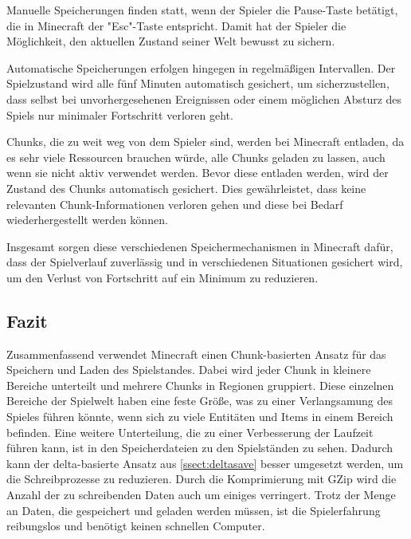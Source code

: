 Manuelle Speicherungen finden statt, wenn der Spieler die Pause-Taste betätigt, die in Minecraft der "Esc"-Taste entspricht. Damit hat der Spieler die Möglichkeit, den aktuellen Zustand seiner Welt bewusst zu sichern.\cite{minecraftSpielstandSpeicherung} 

Automatische Speicherungen erfolgen hingegen in regelmäßigen Intervallen. Der Spielzustand wird alle fünf Minuten automatisch gesichert, um sicherzustellen, dass selbst bei unvorhergesehenen Ereignissen oder einem möglichen Absturz des Spiels nur minimaler Fortschritt verloren geht.\cite{minecraftSpielstandSpeicherung}

Chunks, die zu weit weg von dem Spieler sind, werden bei Minecraft entladen, da es sehr viele Ressourcen brauchen würde, alle Chunks geladen zu lassen, auch wenn sie nicht aktiv verwendet werden. Bevor diese entladen werden, wird der Zustand des Chunks automatisch gesichert. Dies gewährleistet, dass keine relevanten Chunk-Informationen verloren gehen und diese bei Bedarf wiederhergestellt werden können.\cite{minecraftSpielstandSpeicherung}

Insgesamt sorgen diese verschiedenen Speichermechanismen in Minecraft dafür, dass der Spielverlauf zuverlässig und in verschiedenen Situationen gesichert wird, um den Verlust von Fortschritt auf ein Minimum zu reduzieren.




\subsection{Fazit}
Zusammenfassend verwendet Minecraft einen Chunk-basierten Ansatz für das Speichern und Laden des Spielstandes. Dabei wird jeder Chunk in kleinere Bereiche unterteilt und mehrere Chunks in Regionen gruppiert. Diese einzelnen Bereiche der Spielwelt haben eine feste Größe, was zu einer Verlangsamung des Spieles führen könnte, wenn sich zu viele Entitäten und Items in einem Bereich befinden. Eine weitere Unterteilung, die zu einer Verbesserung der Laufzeit führen kann, ist in den Speicherdateien zu den Spielständen zu sehen. Dadurch kann der delta-basierte Ansatz aus \ref{ssect:deltasave} besser umgesetzt werden, um die Schreibprozesse zu reduzieren. Durch die Komprimierung mit GZip wird die Anzahl der zu schreibenden Daten auch um einiges verringert. Trotz der Menge an Daten, die gespeichert und geladen werden müssen, ist die Spielerfahrung reibungslos und benötigt keinen schnellen Computer.\cite{minecraftHardware}



